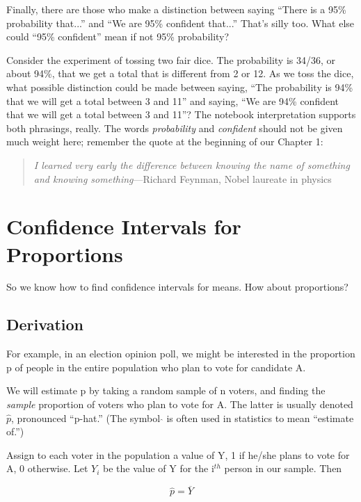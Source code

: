 Finally, there are those who make a distinction between saying ``There
is a 95\% probability that...'' and ``We are 95\% confident that...''
That's silly too.  What else could ``95\% confident'' mean if not
95\% probability?

Consider the experiment of tossing two fair dice.  The probability is
34/36, or about 94\%, that we get a total that is different from 2 or
12.  As we toss the dice, what possible distinction could be made
between saying, ``The probability is 94\% that we will get a total between 3
and 11'' and saying, ``We are 94\% confident that we will get a total
between 3 and 11''?  The notebook interpretation supports both
phrasings, really.  The words {\it probability} and {\it confident}
should not be given much weight here; remember the quote at the
beginning of our Chapter 1:

\begin{quote}
{\it I learned very early the difference between knowing the name of
something and knowing something}---Richard Feynman, Nobel laureate in
physics
\end{quote}


\section{Confidence Intervals for Proportions}
\label{propcis}

So we know how to find confidence intervals for means.  How about
proportions?

\subsection{Derivation}
\label{derivation}

For example, in an election opinion poll, we might be interested in the
proportion p of people in the entire population who plan to vote for
candidate A.  

We will estimate p by taking a random sample of n voters, and finding
the {\it sample} proportion of voters who plan to vote for A.  The
latter is usually denoted $\widehat{p}$, pronounced ``p-hat.''  (The
symbol  $\widehat{ }$ is often used in statistics to mean ``estimate
of.'')

Assign to each voter in the population a value of Y, 1 if he/she plans
to vote for A, 0 otherwise.  Let $Y_i$ be the value of Y for the
i$^{th}$ person in our sample.  Then

\begin{equation}
\label{specialcaseofmean}
\widehat{p} = \overline{Y}
\end{equation}

